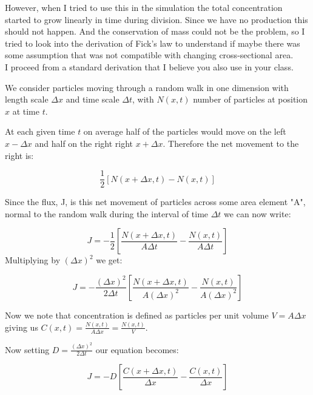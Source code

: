 \documentclass[12pt]{article}
\begin{document}
However, when I tried to use this in the simulation the total concentration started to grow linearly in time during division. Since we have no production this should not happen. And the conservation of mass could not be the problem, so I tried to look into the derivation of Fick's law to understand if maybe there was some assumption that was not compatible with changing cross-sectional area.\\

I proceed from a standard derivation that I believe you also use in your class.

We consider particles moving through a random walk in one dimension with length scale $\Delta x$ and time scale $\Delta t$, with $N(x, t)$ number of particles at position $x$ at time $t$.

At each given time $t$ on average half of the particles would move on the left $x-\Delta x$ and half on the right right $x+\Delta x$. Therefore the net movement to the right is:

\begin{equation}
\frac{1}{2}\left[N(x + \Delta x, t) - N(x, t)\right]
\end{equation}

Since the flux, J, is this net movement of particles across some area element "A", normal to the random walk during the interval of time $\Delta t$ we can now write:

\begin{equation}
J = - \frac{1}{2} \left[\frac{ N(x + \Delta x, t)}{A \Delta t} - \frac{ N(x, t)}{A \Delta t}\right]
\end{equation} 
Multiplying  by $(\Delta x)^2$ we get:


\begin{equation}
 J = -\frac{\left(\Delta x\right)^2}{2 \Delta t}\left[\frac{N(x + \Delta x, t)}{A (\Delta x)^2} - \frac{N(x, t)}{A (\Delta x)^2}\right]
 \end{equation}

Now we note that concentration is defined as particles per unit volume $V=A\Delta x$ giving us $C (x, t) = \frac{N(x, t)}{A \Delta x}=\frac{N(x, t)}{V}$.

Now setting $D=\frac{\left(\Delta x\right)^2}{2 \Delta t}$ our equation becomes:

\begin{equation}
 J = -D \left[\frac{C (x + \Delta x, t)}{\Delta x} - \frac{C (x , t)}{\Delta x}\right]
 \end{equation}
\end{document}
